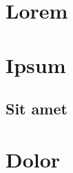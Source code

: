\documentclass{report}
\begin{document}
\tableofcontents

\chapter{Lorem}

\lipsum

\chaprangeon

\chapter{Ipsum}

\lipsum

\section{Sit amet}

\lipsum\lipsum

\chapter{Dolor}

\lipsum

\breakchaprange
\clearpage
\lipsum
\end{document}

